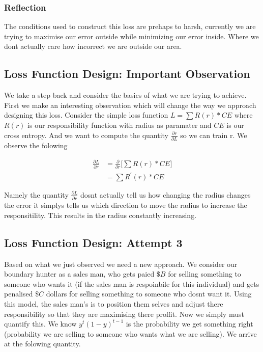 \documentclass{article}
\begin{document}
\subsubsection{Reflection}
The conditions used to construct this loss are prehaps to harsh, currently we are trying to maximise our error outside while minimizing our error inside. Where we dont actually care how incorrect we are outside our area.

\subsection{Loss Function Design: Important Observation}
We take a step back and consider the basics of what we are trying to achieve. First we make an interesting observation which will change the way we approach designing this loss. Consider the simple loss function $L =\sum R(r) * CE$ where $R(r)$ is our responsibility function with radius as paramater and $CE$ is our cross entropy. And we want to compute the quantity $\frac{\partial r}{\partial L}$ so we can train r. We observe the folowing

\begin{align*}
\frac{\partial L}{\partial r} &= \frac{\partial}{\partial r} \big[ \sum R(r) * CE \big] \\
&= \sum R^{'} (r) * CE
\end{align*} 

Namely the quantity $\frac{\partial L}{\partial r}$ dosnt actually tell us how changing the radius changes the error it simplys tells us which direction to move the radius to increase the responsitility. This results in the radius constantly increasing.\\

\subsection{Loss Function Design: Attempt 3}
Based on what we just observed we need a new approach. We consider our boundary hunter as a sales man, who gets paied $\$B$ for selling something to someone who wants it (if the sales man is respoinbile for this individual) and gets penalised $\$C$ dollars for selling something to someone who dosnt want it. Using this model, the sales man's is to position them selves and adjust there responsibility so that they are maximising there proffit. Now we simply must quantify this. We know $y^t(1-y)^{t-1}$ is the probability we get something right (probability we are selling to someone who wants what we are selling). We arrive at the folowing quantity.
\end{document}
